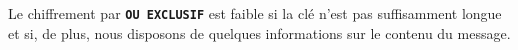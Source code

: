 \documentclass[svgnames,11pt]{beamer}
\begin{document}
\begin{frame}

\begin{aretenir}[Remarque]
    Le chiffrement par \textbf{\texttt{OU EXCLUSIF}} est faible si la clé n'est pas suffisamment longue et si, de plus, nous disposons de quelques informations sur le contenu du message.
\end{aretenir}

\end{frame}
\end{document}
